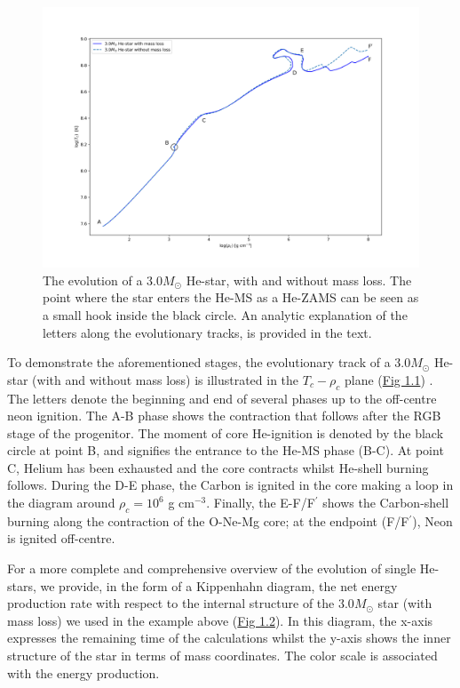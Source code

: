 \documentclass[../../main/thesis_msc.tex]{subfiles}
\begin{document}
				\begin{figure}[t]
					\centering
					\includegraphics[width=\textwidth]{../figures/chapter1/T_rho_plane_ch1.png}
					\caption{The evolution of a $3.0 M_{\odot}$ He-star, with and without mass loss. The point where the star enters the He-MS as a He-ZAMS can be seen as a small hook inside the black circle. An analytic explanation of the letters along the evolutionary tracks, is provided in the text.}
					\label{fig:T_rho_plane_ch1}
				\end{figure}
				
				To demonstrate the aforementioned stages, the evolutionary track of a $3.0 M_{\odot}$ He-star (with and without mass loss) is illustrated in the $T_c - \rho_c$ plane (\hyperref[fig:T_rho_plane_ch1]{Fig 1.1}) \citep[see also][]{Habets_a, Habets_b, Nomoto1987}. The letters denote the beginning and end of several phases up to the off-centre neon ignition. The A-B phase shows the contraction that follows after the RGB stage of the progenitor. The moment of core He-ignition is denoted by the black circle at point B, and signifies the entrance to the He-MS phase (B-C). At point C, Helium has been exhausted and the core contracts whilst He-shell burning follows. During the D-E phase, the Carbon is ignited in the core making a loop in the diagram around $\rho_c = 10^6$ g cm$^{-3}$. Finally, the E-F/F$^\prime$ shows the Carbon-shell burning along the contraction of the O-Ne-Mg core; at the endpoint (F/F$^\prime$), Neon is ignited off-centre.
				
				For a more complete and comprehensive overview of the evolution of single He-stars, we provide, in the form of a Kippenhahn diagram, the net energy production rate with respect to the internal structure of the $3.0 M_{\odot}$ star (with mass loss) we used in the example above (\hyperref[fig:Kipp_3p0_ch1]{Fig 1.2}). In this diagram, the x-axis expresses the remaining time of the calculations whilst the y-axis shows the inner structure of the star in terms of mass coordinates. The color scale is associated with the energy production.
				
\end{document}
